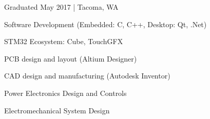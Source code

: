 \documentclass[letterpaper]{deedy-resume} %
\begin{document}
\begin{minipage}[t]{0.33\textwidth}
Graduated May 2017 | Tacoma, WA

\sectionspace %

\sectionspace %

\begin{tightitemize}

\item
Software Development \newline(Embedded: C, C++, \newline Desktop: Qt, .Net)

\item
STM32 Ecosystem: Cube, TouchGFX

\item
PCB design and layout (Altium Designer)

\item
CAD design and manufacturing (Autodesk Inventor)

\item
Power Electronics Design and Controls

\item
Electromechanical System Design

\end{tightitemize}

\sectionspace
{}
\end{minipage} %
\hfill
%
%
\end{document}
